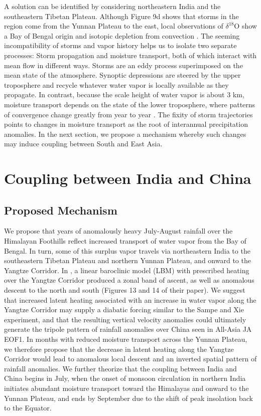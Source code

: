 	 A solution can be identified by considering northeastern India and the southeastern Tibetan Plateau. Although Figure 9d shows that storms in the region come from the Yunnan Plateau to the east, local observations of $\delta^{18}$O show a Bay of Bengal origin and isotopic depletion from convection \citep{Gao2011}. The seeming incompatibility of storms and vapor history helps us to isolate two separate processes: Storm propagation and moisture transport, both of which interact with mean flow in different ways. Storms are an eddy process superimposed on the mean state of the atmosphere. Synoptic depressions are steered by the upper troposphere and recycle whatever water vapor is locally available as they propagate. In contrast, because the scale height of water vapor is about 3 km, moisture transport depends on the state of the lower troposphere, where patterns of convergence change greatly from year to year \citep{Annamalai2001,Yoon2005}. The fixity of storm trajectories points to changes in moisture transport as the root of interannual precipitation anomalies. In the next section, we propose a mechanism whereby such changes may induce coupling between South and East Asia.
	
\section{Coupling between India and China}

\subsection{Proposed Mechanism}

	We propose that years of anomalously heavy July-August rainfall over the Himalayan Foothills reflect increased transport of water vapor from the Bay of Bengal. In turn, some of this surplus vapor travels via northeastern India to the southeastern Tibetan Plateau and northern Yunnan Plateau, and onward to the Yangtze Corridor. In \cite{Sampe2010}, a linear baroclinic model (LBM) with prescribed heating over the Yangtze Corridor produced a zonal band of ascent, as well as anomalous descent to the north and south (Figures 13 and 14 of their paper). We suggest that increased latent heating associated with an increase in water vapor along the Yangtze Corridor may supply a diabatic forcing similar to the Sampe and Xie experiment, and that the resulting vertical velocity anomalies could ultimately generate the tripole pattern of rainfall anomalies over China seen in All-Asia JA EOF1. In months with reduced moisture transport across the Yunnan Plateau, we therefore propose that the decrease in latent heating along the Yangtze Corridor would lead to anomalous local descent and an inverted spatial pattern of rainfall anomalies. We further theorize that the coupling between India and China begins in July, when the onset of monsoon circulation in northern India initiates abundant moisture transport toward the Himalayas and onward to the Yunnan Plateau, and ends by September due to the shift of peak insolation back to the Equator.
	
